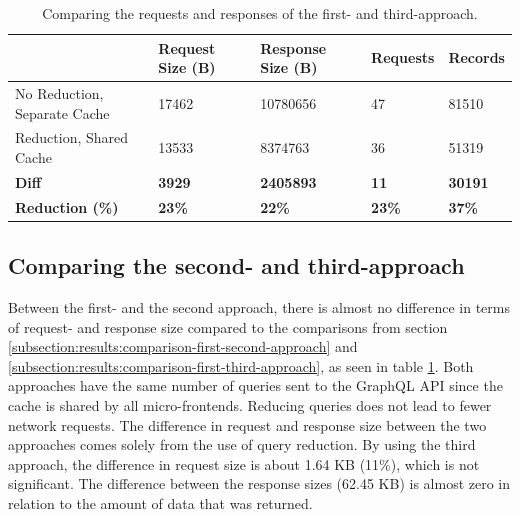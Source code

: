 \ifshowTables
\begin{table}[H]
    \begin{tabular}{|l|l|l|l|l|}
    \hline
       & Request Size (B) & Response Size (B) & Requests & Records  \\
    \hline
     No Reduction, Separate Cache & 17462 & 10780656 & 47 & 81510 \\
     \hline
     Reduction, Shared Cache & 13533 & 8374763 & 36 & 51319 \\
     \hline
     \hline
     \textbf{Diff} & \textbf{3929} & \textbf{2405893} & \textbf{11} & \textbf{30191} \\
     \hline
    \textbf{Reduction (\%)} & \textbf{23\%} & \textbf{22\%} & \textbf{23\%} & \textbf{37\%} \\
     \hline
    \end{tabular}
    \caption{Comparing the requests and responses of the first- and third-approach.}
    \label{table:results:size-comparison-first-path-no-cache-no-reduction-cache-reduction}
\end{table}
\fi

\subsection{Comparing the second- and third-approach}

Between the first- and the second approach, there is almost no difference in terms of request- and response size compared to the comparisons from section \ref{subsection:results:comparison-first-second-approach} and \ref{subsection:results:comparison-first-third-approach}, as seen in table \ref{table:results:size-comparison-first-path-no-cache-no-reduction-cache-reduction}. Both approaches have the same number of queries sent to the GraphQL \ac{API} since the cache is shared by all micro-frontends. Reducing queries does not lead to fewer network requests. The difference in request and response size between the two approaches comes solely from the use of query reduction. By using the third approach, the difference in request size is about 1.64 KB (11\%), which is not significant. The difference between the response sizes (62.45 KB) is almost zero in relation to the amount of data that was returned.

